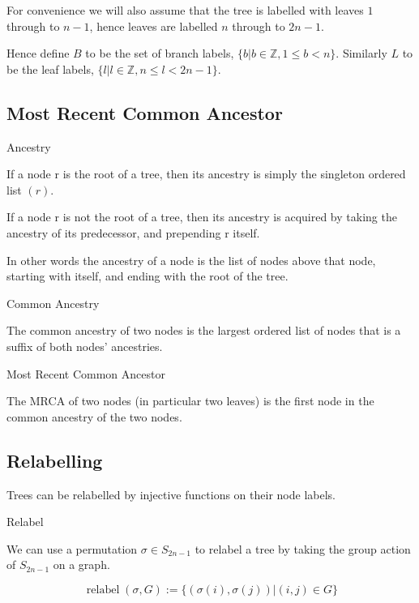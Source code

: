 \documentclass{report}
\begin{document}
For convenience we will also assume that the tree is labelled with leaves $1$ through to $n-1$,
hence leaves are labelled $n$ through to $2n-1$.

Hence define $B$ to be the set of branch labels, $\{b | b \in \mathds{Z}, 1 \leq b < n\}$.
Similarly $L$ to be the leaf labels, $\{l | l \in \mathds{Z}, n \leq l < 2n-1\}$.

\subsection{Most Recent Common Ancestor}

\begin{definition} Ancestry

	If a node r is the root of a tree, then its ancestry is simply the singleton ordered list $(r)$.

	If a node r is not the root of a tree, then its ancestry is acquired by taking the ancestry of its predecessor, and prepending r itself.

	In other words the ancestry of a node is the list of nodes above that node, starting with itself, and ending with the root of the tree.
\end{definition}

\begin{definition} Common Ancestry

	The common ancestry of two nodes is the largest ordered list of nodes that is a suffix of both nodes' ancestries.
\end{definition}

\begin{definition} Most Recent Common Ancestor

	The MRCA of two nodes (in particular two leaves) is the first node in the common ancestry of the two nodes.
\end{definition}


\subsection{Relabelling}

Trees can be relabelled by injective functions on their node labels.

\DeclareMathOperator{\relabel}{relabel}

\begin{definition} Relabel

	We can use a permutation $\sigma \in S_{2n-1}$ to relabel a tree by taking the group action of $S_{2n-1}$ on a graph.

	\[
		\relabel(\sigma, G) := \{(\sigma(i), \sigma(j)) | (i, j) \in G\}
	\]
\end{definition}
\end{document}
